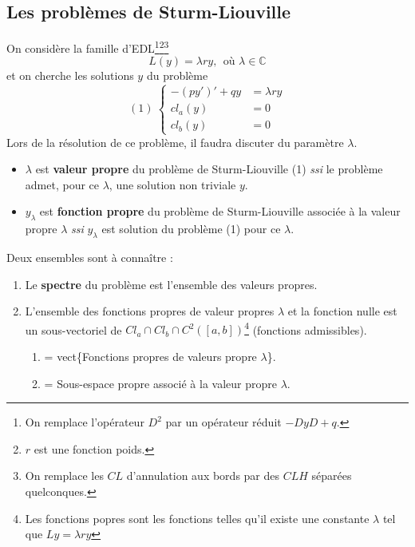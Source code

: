 \documentclass	[11pt, a4paper, openany]{book}
\begin{document}
			\subsection{Les problèmes de Sturm-Liouville}
			On considère la famille d'EDL\footnote{On remplace l'opérateur $D^2$ par un opérateur réduit $-DyD+q$.}\footnote{$r$ est une fonction poids. }\footnote{On remplace les $CL$ d'annulation aux bords par des $CLH$ séparées quelconques.}
			\begin{equation}
				L(y) = \lambda ry,\ \ \text{où } \lambda \in \mathbb{C}
			\end{equation}
			et on cherche les solutions $y$ du problème
			\begin{equation}
				(1)\ \left\{\begin{array}{ll}
				-(py')' + qy &= \lambda r y\\
				cl_a(y) &= 0\\
				cl_b(y) &= 0
				\end{array}\right.
			\end{equation}
			Lors de la résolution de ce problème, il faudra discuter du paramètre $\lambda$.\\
			
			\begin{itemize}
				\item $\lambda$ est \textbf{valeur propre} du problème de Sturm-Liouville  (1) \textit{ssi} le problème admet, pour ce $\lambda$, une solution non triviale $y$.
				\item $y_\lambda$ est \textbf{fonction propre} du problème de Sturm-Liouville associée à la valeur propre $\lambda$ \textit{ssi} $y_\lambda$ est solution du problème (1) pour ce $\lambda$.
			\end{itemize}
			Deux ensembles sont à connaître :
			\begin{enumerate}
				\item Le \textbf{spectre} du problème est l'ensemble des valeurs propres. 
				\item L'ensemble des fonctions propres de valeur propres $\lambda$ et la fonction nulle est un sous-vectoriel de $Cl_a\cap Cl_b \cap C^2([a,b])$\footnote{Les fonctions popres sont les fonctions telles qu'il existe une constante $\lambda$ tel que $Ly = \lambda r y$} (fonctions admissibles).\begin{enumerate}
				\item = vect\{Fonctions propres de valeurs propre $\lambda$\}.
				\item = Sous-espace propre associé à la valeur propre $\lambda$.
			\end{enumerate}
			\end{enumerate}
			
\end{document}
